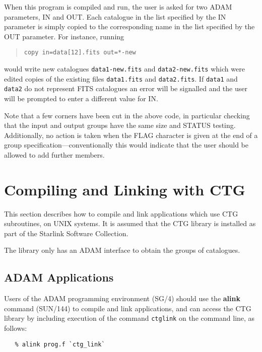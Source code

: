 \documentclass[twoside,11pt]{article}
\newcommand{\latex}[1]{#1}
\newcommand{\xref}[3]{#1}
\renewcommand{\_}{\texttt{\symbol{95}}}
\begin{document}
When this program is compiled and run, the user is asked for 
two ADAM parameters, IN and OUT.  Each catalogue in the list specified
by the IN parameter is simply copied to the corresponding name in the 
list specified by the OUT parameter.  For instance, running
\begin{quote}
\latexonly{\small}
\begin{verbatim}
copy in=data[12].fits out=*-new
\end{verbatim}
\end{quote}
would write new catalogues {\tt data1-new.fits} and {\tt data2-new.fits}
which were edited copies of the existing files {\tt data1.fits} and
{\tt data2.fits}.
If {\tt data1} and {\tt data2} do not represent FITS catalogues
an error will be signalled and the user will be prompted to enter
a different value for IN.

Note that a few corners have been cut in the above code, in particular
checking that the input and output groups have the same size and
STATUS testing.  Additionally, no action is taken when the FLAG
character is given at the end of a group 
specification---conventionally this would indicate that the user
should be allowed to add further members.

\section {Compiling and Linking with CTG}

This section describes how to compile and link applications which use
CTG subroutines, on UNIX systems. It is assumed that the CTG library
is installed as part of the Starlink Software Collection.

The library only has an ADAM interface to obtain the groups of
catalogues.

\subsection{\label{ss:buildingadamapplications}ADAM Applications}
Users of the \xref{ADAM}{sg4}{} programming environment
\latex{(SG/4)} should use
the \xref{{\bf alink}}{sun144}{ADAM_link_scripts} command
(\xref{SUN/144}{sun144}{}) to compile and link applications, and can
access the CTG\_ library by including execution of the command
{\tt ctg\_link} on the command line, as follows:

\small
\begin{verbatim}
   % alink prog.f `ctg_link`
\end{verbatim}
\normalsize
\end{document}
